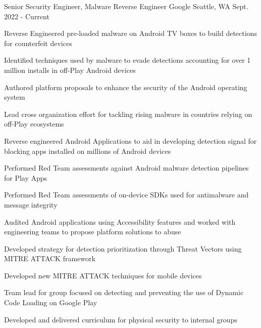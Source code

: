 \begin{cventries}
\cventry
{Senior Security Engineer, Malware Reverse Engineer} %
{Google}
{Seattle, WA}
{Sept. 2022 - Current}
{
    \begin{cvitems}
        \item {Reverse Engineered pre-loaded malware on Android TV boxes to build detections for counterfeit devices}
        \item {Identified techniques used by malware to evade detections accounting for over 1 million installs in off-Play Android devices}
        \item {Authored platform proposals to enhance the security of the Android operating system}
        \item {Lead cross organization effort for tackling rising malware in countries relying on off-Play ecosystems}
        \item {Reverse engineered Android Applications to aid in developing detection signal for blocking apps installed on millions of Android devices}
        \item {Performed Red Team assessments against Android malware detection pipelines for Play Apps}
        \item {Performed Red Team assessments of on-device SDKs used for antimalware and message integrity}
        \item {Audited Android applications using Accessibility features and worked with engineering teams to propose platform solutions to abuse}
        \item {Developed strategy for detection prioritization through Threat Vectors using MITRE ATTACK framework}
        \item {Developed new MITRE ATTACK techniques for mobile devices}
        \item {Team lead for group focused on detecting and preventing the use of Dynamic Code Loading on Google Play}
        \item {Developed and delivered curriculum for physical security to internal groups}
    \end{cvitems}
}



\end{cventries}
